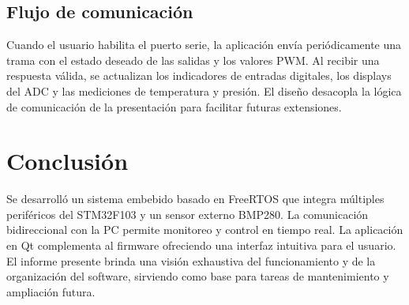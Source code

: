 \documentclass{article}
\begin{document}
\subsection{Flujo de comunicación}
Cuando el usuario habilita el puerto serie, la aplicación envía periódicamente una trama con el estado deseado de las salidas y los valores PWM. Al recibir una respuesta válida, se actualizan los indicadores de entradas digitales, los displays del ADC y las mediciones de temperatura y presión. El diseño desacopla la lógica de comunicación de la presentación para facilitar futuras extensiones.

\section{Conclusión}
Se desarrolló un sistema embebido basado en FreeRTOS que integra múltiples periféricos del STM32F103 y un sensor externo BMP280. La comunicación bidireccional con la PC permite monitoreo y control en tiempo real. La aplicación en Qt complementa al firmware ofreciendo una interfaz intuitiva para el usuario. El informe presente brinda una visión exhaustiva del funcionamiento y de la organización del software, sirviendo como base para tareas de mantenimiento y ampliación futura.
\end{document}
